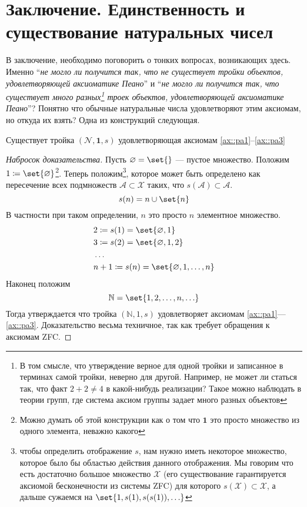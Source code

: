 \documentclass{article}
\begin{document}
\section{Заключение. Единственность и существование натуральных чисел}
В заключение, необходимо поговорить о тонких вопросах, возникающих здесь. Именно \enquote{\textit{не могло ли получится так, что не существует тройки объектов, удовлетворяющей аксиоматике Пеано}} и \enquote{\textit{не могло ли получится так, что существует много разных\footnote{В том смысле, что утверждение верное для одной тройки и записанное в терминах самой тройки, неверно для другой. Например, не может ли статься так, что факт \(2 + 2 \neq 4\) в какой-нибудь реализации? Такое можно наблюдать в теории групп, где система аксиом группы задает много разных объектов} троек объектов, удовлетворяющей аксиоматике Пеано}}? Понятно что обычные натуральные числа удовлетворяют этим аксиомам, но откуда их взять? Одна из конструкций следующая. 
\begin{theorem}
    \label{th::nat-numbers-existance}
    Существует тройка \((\mathcal{N}, \mathbf{1}, s)\) удовлетворяющая аксиомам \ref{ax::pa1}--\ref{ax::pa3}
\end{theorem}
\begin{proof}[Набросок доказательства]
    Пусть \(\varnothing = \set{}\) --- пустое множество. Положим \(1 \coloneqq \set{\varnothing}\)\footnote{Можно думать об этой конструкции как о том что \(\mathbf{1}\) это просто множество из одного элемента, неважно какого}. Теперь положим\footnote{чтобы определить отображение \(s\), нам нужно иметь некоторое множество, которое было бы областью действия данного отображения. Мы говорим что есть достаточно большое множество \(\mathcal{X}\) (его существование гарантируется аксиомой бесконечности из системы ZFC) для которого \(s(\mathcal{X}) \subset \mathcal{X}\), а дальше сужаемся на \(\set{1, s(1), s(s(1)), \ldots}\)}, которое может быть определено как пересечение всех подмножеств \(\mathcal{A} \subset \mathcal{X}\) таких, что \(s(\mathcal{A}) \subset \mathcal{A}\).  
    \[
        s(n) = n \cup \set{n}
    \]
    В частности при таком определении, \(n\) это просто \(n\) элементное множество. 
    \begin{align*}
        & 2 \coloneqq s(1) = \set{\varnothing, 1} \\
        & 3 \coloneqq s(2) = \set{\varnothing, 1, 2} \\
        & \ldots \\
        & n+1 \coloneqq s(n) = \set{\varnothing, 1, \ldots, n} 
    \end{align*}
    Наконец положим
    \[
        \mathbb{N} = \set{1, 2, \ldots, n, \ldots}
    \]
    Тогда утверждается что тройка \((\mathbb{N}, 1, s)\) удовлетворяет аксиомам \ref{ax::pa1}---\ref{ax::pa3}. Доказательство весьма техничное, так как требует обращения к аксиомам ZFC.
\end{proof}
\end{document}
